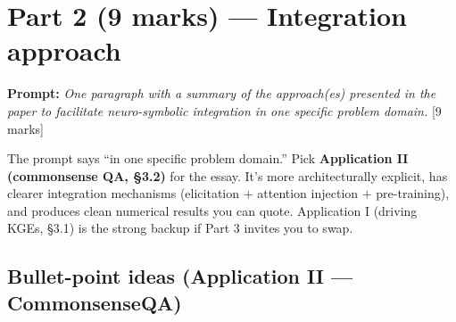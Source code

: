 \documentclass[11pt, a4paper]{article}
\begin{document}
\section{Part 2 (9 marks) — Integration approach}

\textbf{Prompt:} \emph{One paragraph with a summary of the approach(es) presented in the paper to facilitate neuro-symbolic integration in one specific problem domain.} [9 marks]

\begin{notebox}
The prompt says ``in one specific problem domain.'' Pick \textbf{Application II (commonsense QA, §3.2)} for the essay. It's more architecturally explicit, has clearer integration mechanisms (elicitation $+$ attention injection $+$ pre-training), and produces clean numerical results you can quote. Application I (driving KGEs, §3.1) is the strong backup if Part 3 invites you to swap.
\end{notebox}

\subsection{Bullet-point ideas (Application II — CommonsenseQA)}
\end{document}
